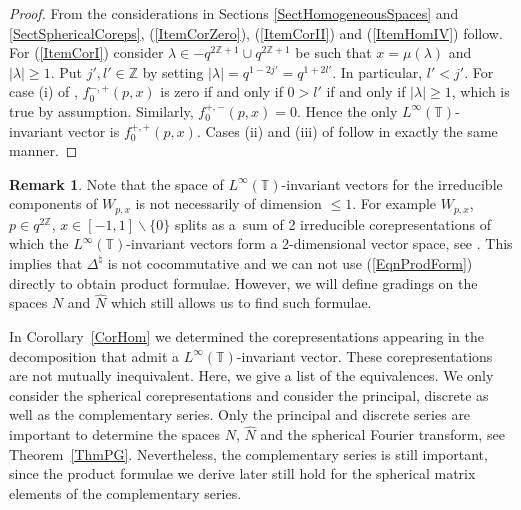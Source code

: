 \documentclass[pdftex]{sigma}
\numberwithin{equation}{section}
\theoremstyle{definition}
\newtheorem{rmk}[thm]{Remark}
\begin{document}
\begin{proof}
From the considerations in Sections \ref{SectHomogeneousSpaces} and \ref{SectSphericalCoreps}, (\ref{ItemCorZero}), (\ref{ItemCorII}) and (\ref{ItemHomIV}) follow. For  (\ref{ItemCorI}) consider $\lambda \in -q^{2 \mathbb{Z} +1} \cup q^{2 \mathbb{Z} +1}$ be such that $x = \mu(\lambda)$ and $\vert \lambda \vert \geq 1$. Put $j', l' \in \mathbb{Z}$ by setting $\vert \lambda \vert = q^{1-2j'} =   q^{1+2l '}$. In particular, $l' < j'$. For case (i) of \cite[Proposition 5.2]{GroKoeKus}, $f^{-,+}_0(p,x)$ is zero if and only if $0 > l'$ if and only if $\vert \lambda \vert \geq 1$, which is true by assumption. Similarly, $f^{+,-}_0(p,x) = 0$. Hence the only $L^\infty(\mathbb{T})$-invariant vector is $f^{+,+}_0(p,x)$. Cases (ii) and (iii) of \cite[Proposition 5.2]{GroKoeKus} follow in exactly the same manner.
\end{proof}

\begin{rmk}
Note that the space of $L^\infty(\mathbb{T})$-invariant vectors for the irreducible components of $W_{p,x}$ is not necessarily of dimension $\leq 1$. For example $W_{p,x}$, $p \in q^{2\mathbb{Z}}$, $x \in [-1,1] \backslash \{0\}$ splits as a~sum of 2 irreducible corepresentations of which the $L^\infty(\mathbb{T})$-invariant vectors form a 2-dimensional vector space, see \cite[Section 10.2]{GroKoeKus}. This implies that $\Delta^\natural$ is not cocommutative and we can not use (\ref{EqnProdForm}) directly to obtain product formulae. However, we will def\/ine gradings on the spaces $N$ and $\hat{N}$ which still allows us to f\/ind such formulae.
\end{rmk}

In Corollary~\ref{CorHom} we determined the corepresentations appearing in the decomposition that admit a $L^\infty(\mathbb{T})$-invariant vector. These corepresentations are not mutually inequivalent. Here, we give a list of the equivalences. We only consider the spherical corepresentations and consider the principal, discrete as well as the complementary series.  Only the principal and discrete series are important to determine the spaces $N$, $\hat{N}$ and the spherical Fourier transform, see Theo\-rem~\ref{ThmPG}. Nevertheless, the complementary series is still important, since  the product formulae we derive later still hold for the spherical matrix elements of the complementary series.
\end{document}
